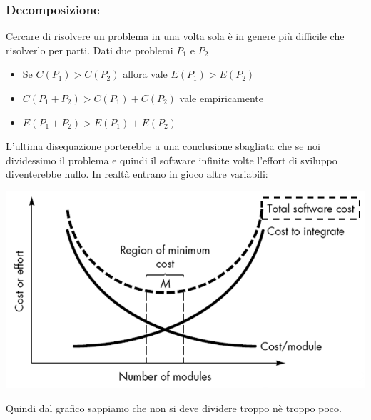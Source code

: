\documentclass[12pt, a4paper]{report}
\begin{document}
\subsubsection{Decomposizione}
Cercare di risolvere un problema in una volta sola è in genere più difficile che risolverlo per parti.
Dati due problemi $P_{1}$ e $P_{2}$
\begin{itemize}
    \item Se $C(P_{1})>C(P_{2})$ allora vale $E(P_{1})>E(P_{2})$
    \item $C(P_{1}+P_{2})>C(P_{1})+C(P_{2})$ vale empiricamente
    \item $E(P_{1}+P_{2})>E(P_{1})+E(P_{2})$
\end{itemize}
L'ultima disequazione porterebbe a una conclusione sbagliata che se noi dividessimo il problema e quindi il software infinite volte l'effort di sviluppo diventerebbe nullo. In realtà entrano in gioco altre variabili:
\begin{center}
    \includegraphics[width=.7\textwidth]{Immagini/decomposizionegraph.png}
\end{center}
Quindi dal grafico sappiamo che non si deve dividere troppo nè troppo poco.
\end{document}
